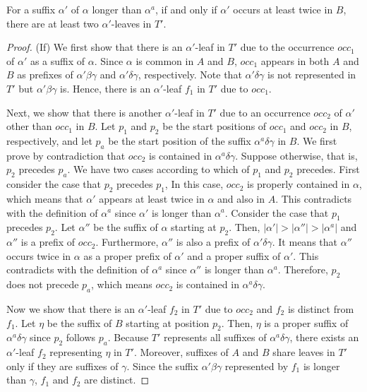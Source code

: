 \documentclass{llncs}
\begin{document}
\begin{lemma} \label{lem:1}
For a suffix $\alpha'$ of $\alpha$ longer than $\alpha^{a}$,
 if and only if $\alpha'$ occurs at least twice in $B$,
 there are at least two $\alpha'$-leaves in $T'$.
\end{lemma}
\begin{proof}
(If) We first show that there is an $\alpha'$-leaf in $T'$
      due to the occurrence $occ_1$ of $\alpha'$ as a suffix of $\alpha$.
     Since $\alpha$ is common in $A$ and $B$,
      $occ_1$ appears in both $A$ and $B$
      as prefixes of $\alpha'\beta\gamma$ and $\alpha'\delta\gamma$, respectively.
     Note that $\alpha'\delta\gamma$ is not represented in $T'$
     but $\alpha'\beta\gamma$ is.
     Hence, there is an $\alpha'$-leaf $f_1$ in $T'$ due to $occ_1$.

    Next, we show that there is another $\alpha'$-leaf in $T'$
     due to an occurrence $occ_2$ of $\alpha'$ other than $occ_1$ in $B$.
Let $p_1$ and $p_2$ be the start positions of $occ_1$ and $occ_2$ in $B$, respectively,
    and let $p_a$ be the start position of the suffix $\alpha^{a}\delta\gamma$ in $B$.
We first prove by contradiction that $occ_2$ is contained in $\alpha^{a}\delta\gamma$.
    Suppose otherwise, that is, $p_2$ precedes $p_a$.
    We have two cases according to which of $p_1$ and $p_2$ precedes.
First consider the case that $p_2$ precedes $p_1$,
    In this case, $occ_2$ is properly contained in $\alpha$,
     which means that $\alpha'$ appears at least twice in $\alpha$
     and also in $A$.
    This contradicts with the definition of $\alpha^{a}$
     since $\alpha'$ is longer than $\alpha^{a}$.
    Consider the case that $p_1$ precedes $p_2$.
    Let $\alpha''$ be the suffix of $\alpha$ starting at $p_2$.
    Then, $|\alpha'| > |\alpha''| > |\alpha^{a}|$
     and $\alpha''$ is a prefix of $occ_2$.
    Furthermore, $\alpha''$ is also a prefix of $\alpha'\delta\gamma$.
It means that $\alpha''$ occurs twice in $\alpha$
     as a proper prefix of $\alpha'$ and a proper suffix of $\alpha'$.
    This contradicts with the definition of $\alpha^{a}$
     since $\alpha''$ is longer than $\alpha^{a}$.
    Therefore, $p_2$ does not precede $p_a$,
     which means $occ_2$ is contained in $\alpha^{a}\delta\gamma$.

    Now we show that there is an $\alpha'$-leaf $f_2$ in $T'$ due to $occ_2$
     and $f_2$ is distinct from $f_1$.
    Let $\eta$ be the suffix of $B$ starting at position $p_2$.
    Then, $\eta$ is a proper suffix of $\alpha^{a}\delta\gamma$
     since $p_2$ follows $p_a$.
    Because $T'$ represents all suffixes of $\alpha^{a}\delta\gamma$,
     there exists an $\alpha'$-leaf $f_2$ representing $\eta$ in $T'$.
    Moreover, suffixes of $A$ and $B$ share leaves in $T'$
     only if they are suffixes of $\gamma$.
    Since the suffix $\alpha'\beta\gamma$ represented by $f_1$ is longer than $\gamma$,
    $f_1$ and $f_2$ are distinct.



\end{proof}
\end{document}
